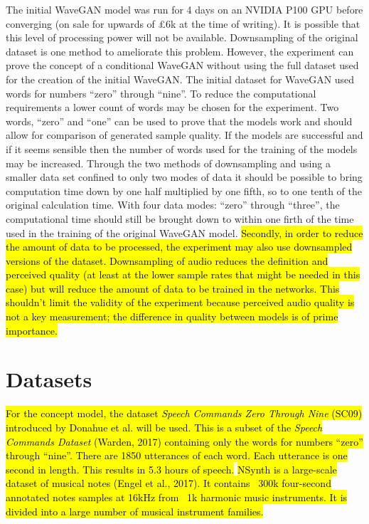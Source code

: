 \documentclass{article}
\begin{document}
The initial WaveGAN model was run for 4 days on an NVIDIA P100 GPU before converging (on sale for upwards of £6k at the time of writing).
It is possible that this level of processing power will not be available.
Downsampling of the original dataset is one method to ameliorate this problem.
\newline
\newline
However, the experiment can prove the concept of a conditional WaveGAN without using the full dataset used for the creation of the initial WaveGAN.
The initial dataset for WaveGAN used words for numbers ``zero'' through ``nine''.
To reduce the computational requirements a lower count of words may be chosen for the experiment.
Two words, ``zero'' and ``one'' can be used to prove that the models work and should allow for comparison of generated sample quality.
If the models are successful and if it seems sensible then the number of words used for the training of the models may be increased.
\newline
\newline
Through the two methods of downsampling and using a smaller data set confined to only two modes of data it should be possible to bring computation time down by one half multiplied by one fifth, so to one tenth of the original calculation time.
With four data modes: ``zero'' through ``three'', the computational time should still be brought down to within one firth of the time used in the training of the original WaveGAN model.
\newline
\newline
\hl{Secondly, in order to reduce the amount of data to be processed, the experiment may also use downsampled versions of the dataset.
Downsampling of audio reduces the definition and perceived quality (at least at the lower sample rates that might be needed in this case) but will reduce the amount of data to be trained in the networks.
This shouldn't limit the validity of the experiment because perceived audio quality is not a key measurement; the difference in quality between models is of prime importance.}

\section{Datasets}

\hl{
For the concept model, the dataset \textit{Speech Commands Zero Through Nine} (SC09) introduced by Donahue et al. will be used.
This is a subset of the \textit{Speech Commands Dataset} (Warden, 2017) containing only the words for numbers ``zero'' through ``nine''.
There are 1850 utterances of each word.
Each utterance is one second in length.
This results in 5.3 hours of speech.}
\newline
\newline
\hl{
NSynth is a large-scale dataset of musical notes (Engel et al., 2017).
It contains ~300k four-second annotated notes samples at 16kHz from ~1k harmonic music instruments.
It is divided into a large number of musical instrument families.}
\end{document}
